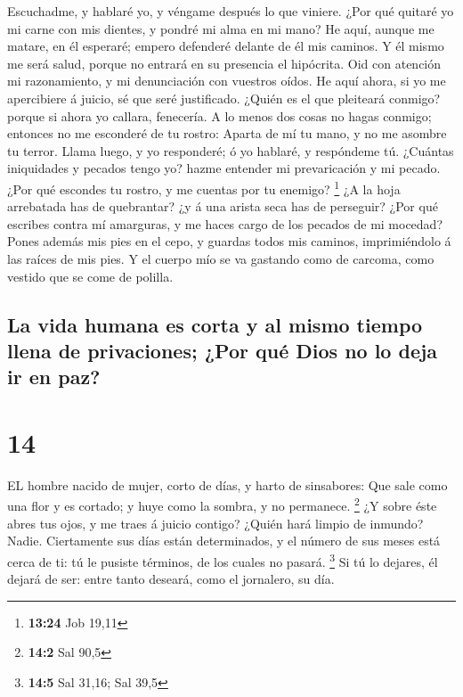  Escuchadme, y hablaré yo, y véngame después lo que
viniere.  ¿Por qué quitaré yo mi carne con mis dientes, y
pondré mi alma en mi mano?  He aquí, aunque me matare, en
él esperaré; empero defenderé delante de él mis caminos. 
Y él mismo me será salud, porque no entrará en su presencia el
hipócrita.  Oid con atención mi razonamiento, y mi
denunciación con vuestros oídos.  He aquí ahora, si yo me
apercibiere á juicio, sé que seré justificado.  ¿Quién es
el que pleiteará conmigo? porque si ahora yo callara, fenecería.
 A lo menos dos cosas no hagas conmigo; entonces no me
esconderé de tu rostro:  Aparta de mí tu mano, y no me
asombre tu terror.  Llama luego, y yo responderé; ó yo
hablaré, y respóndeme tú.  ¿Cuántas iniquidades y pecados
tengo yo? hazme entender mi prevaricación y mi pecado. 
¿Por qué escondes tu rostro, y me cuentas por tu enemigo? \footnote{\textbf{13:24}
  Job 19,11}  ¿A la hoja arrebatada has de quebrantar? ¿y
á una arista seca has de perseguir?  ¿Por qué escribes
contra mí amarguras, y me haces cargo de los pecados de mi mocedad?
 Pones además mis pies en el cepo, y guardas todos mis
caminos, imprimiéndolo á las raíces de mis pies.  Y el
cuerpo mío se va gastando como de carcoma, como vestido que se come de
polilla.

\hypertarget{la-vida-humana-es-corta-y-al-mismo-tiempo-llena-de-privaciones-por-quuxe9-dios-no-lo-deja-ir-en-paz}{%
\subsection{La vida humana es corta y al mismo tiempo llena de
privaciones; ¿Por qué Dios no lo deja ir en
paz?}\label{la-vida-humana-es-corta-y-al-mismo-tiempo-llena-de-privaciones-por-quuxe9-dios-no-lo-deja-ir-en-paz}}

\hypertarget{section-13}{%
\section{14}\label{section-13}}

 EL hombre nacido de mujer, corto de días, y harto de
sinsabores:  Que sale como una flor y es cortado; y huye
como la sombra, y no permanece. \footnote{\textbf{14:2} Sal 90,5}
 ¿Y sobre éste abres tus ojos, y me traes á juicio
contigo?  ¿Quién hará limpio de inmundo? Nadie.
 Ciertamente sus días están determinados, y el número de
sus meses está cerca de ti: tú le pusiste términos, de los cuales no
pasará. \footnote{\textbf{14:5} Sal 31,16; Sal 39,5}  Si
tú lo dejares, él dejará de ser: entre tanto deseará, como el jornalero,
su día.

